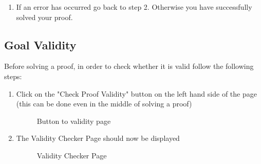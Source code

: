 \begin{enumerate}
		\item If an error has occurred go back to step 2. Otherwise you have successfully solved your proof.
		
		
\end{enumerate}
\pagebreak
\subsection{Goal Validity}

Before solving a proof, in order to check whether it is valid follow the following steps:

\begin{enumerate}
	\item Click on the "Check Proof Validity" button on the left hand side of the page (this can be done even in the middle of solving a proof)
	
	\begin{figure}[!ht]
		\centering
		\caption{Button to validity page}
	\end{figure}

	\item The Validity Checker Page should now be displayed
	
	\begin{figure}[!ht]
		\centering
		\caption{Validity Checker Page}
	\end{figure}
	

\end{enumerate}
